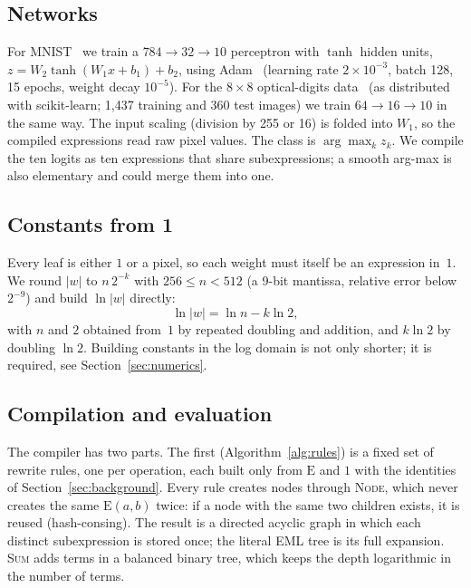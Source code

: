 \documentclass[11pt]{article}
\newcommand{\E}{\mathrm{E}}
\begin{document}
\subsection{Networks}
For MNIST~\cite{lecun1998} we train a $784\!\to\!32\!\to\!10$ perceptron with
$\tanh$ hidden units, $z=W_2\tanh(W_1x+b_1)+b_2$, using Adam~\cite{kingma2015}
(learning rate $2\times10^{-3}$, batch 128, 15 epochs, weight decay $10^{-5}$).
For the $8\times8$ optical-digits data~\cite{alpaydin1998} (as distributed with
scikit-learn; 1{,}437 training and 360 test images) we train
$64\!\to\!16\!\to\!10$ in the same way. The input scaling (division by 255 or
16) is folded into $W_1$, so the compiled expressions read raw pixel values.
The class is $\arg\max_k z_k$. We compile the ten logits as ten expressions
that share subexpressions; a smooth arg-max is also elementary and could
merge them into one.

\subsection{Constants from 1}
Every leaf is either $1$ or a pixel, so each weight must itself be an
expression in~$1$. We round $|w|$ to $n\,2^{-k}$ with $256\le n<512$
(a 9-bit mantissa, relative error below $2^{-9}$) and build $\ln|w|$ directly:
\[
  \ln|w| = \ln n - k\ln 2 ,
\]
with $n$ and $2$ obtained from~$1$ by repeated doubling and addition, and
$k\ln2$ by doubling $\ln 2$. Building constants in the log domain is not
only shorter; it is required, see Section~\ref{sec:numerics}.

\subsection{Compilation and evaluation}
The compiler has two parts. The first (Algorithm~\ref{alg:rules}) is a fixed
set of rewrite rules, one per operation, each built only from $\E$ and $1$
with the identities of Section~\ref{sec:background}. Every rule creates nodes
through \textsc{Node}, which never creates the same $\E(a,b)$ twice: if a
node with the same two children exists, it is reused (hash-consing). The
result is a directed acyclic graph in which each distinct subexpression is
stored once; the literal EML tree is its full expansion. \textsc{Sum} adds
terms in a balanced binary tree, which keeps the depth logarithmic in the
number of terms.
\end{document}
